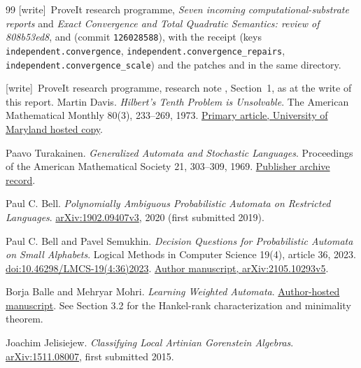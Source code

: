 \documentclass[11pt,letterpaper]{article}
\theoremstyle{definition}
\theoremstyle{remark}
\newcommand{\wtag}{\textup{[write]}}
\begin{document}
\begin{thebibliography}{99}
\wtag\ ProveIt research programme, \emph{Seven incoming computational-substrate reports} and \emph{Exact Convergence and Total Quadratic Semantics: review of 808b53ed8},  and  (commit \texttt{126028588}), with the receipt  (keys \texttt{independent.convergence}, \texttt{independent.convergence\_repairs}, \texttt{independent.convergence\_scale}) and the patches  and  in the same directory.

\wtag\ ProveIt research programme, research note , Section~1, as at the write of this report.
Martin Davis.
\emph{Hilbert's Tenth Problem is Unsolvable}.
The American Mathematical Monthly 80(3), 233--269, 1973.
\href{https://www.math.umd.edu/~laskow/Pubs/713/Diophantine.pdf}{Primary article,
University of Maryland hosted copy}.

Paavo Turakainen.
\emph{Generalized Automata and Stochastic Languages}.
Proceedings of the American Mathematical Society 21, 303--309, 1969.
\href{https://www.jstor.org/stable/2036989}{Publisher archive record}.

Paul C. Bell.
\emph{Polynomially Ambiguous Probabilistic Automata on Restricted Languages}.
\href{https://arxiv.org/abs/1902.09407v3}{arXiv:1902.09407v3}, 2020
(first submitted 2019).

Paul C. Bell and Pavel Semukhin.
\emph{Decision Questions for Probabilistic Automata on Small Alphabets}.
Logical Methods in Computer Science 19(4), article 36, 2023.
\href{https://doi.org/10.46298/LMCS-19(4:36)2023}{doi:10.46298/LMCS-19(4:36)2023}.
\href{https://arxiv.org/abs/2105.10293v5}{Author manuscript, arXiv:2105.10293v5}.

Borja Balle and Mehryar Mohri.
\emph{Learning Weighted Automata}.
\href{https://borjaballe.github.io/papers/cai15.pdf}{Author-hosted manuscript}.
See Section 3.2 for the Hankel-rank characterization and minimality theorem.

Joachim Jelisiejew.
\emph{Classifying Local Artinian Gorenstein Algebras}.
\href{https://arxiv.org/abs/1511.08007}{arXiv:1511.08007}, first submitted 2015.


\end{thebibliography}
\end{document}

